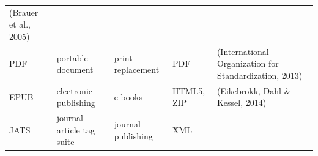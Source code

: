 \documentclass[10pt,fleqn]{wlpeerj}
\begin{document}
\begin{longtable}[c]{@{}lllll@{}}
\begin{minipage}[t]{0.40\columnwidth}
(Brauer et al., 2005)
\strut\end{minipage}\tabularnewline
\begin{minipage}[t]{0.06\columnwidth}\raggedright\strut
PDF
\strut\end{minipage} &
\begin{minipage}[t]{0.18\columnwidth}\raggedright\strut
portable document
\strut\end{minipage} &
\begin{minipage}[t]{0.13\columnwidth}\raggedright\strut
print replacement
\strut\end{minipage} &
\begin{minipage}[t]{0.09\columnwidth}\raggedright\strut
PDF
\strut\end{minipage} &
\begin{minipage}[t]{0.40\columnwidth}\raggedright\strut
(International Organization for Standardization, 2013)
\strut\end{minipage}\tabularnewline
\begin{minipage}[t]{0.06\columnwidth}\raggedright\strut
EPUB
\strut\end{minipage} &
\begin{minipage}[t]{0.18\columnwidth}\raggedright\strut
electronic publishing
\strut\end{minipage} &
\begin{minipage}[t]{0.13\columnwidth}\raggedright\strut
e-books
\strut\end{minipage} &
\begin{minipage}[t]{0.09\columnwidth}\raggedright\strut
HTML5, ZIP
\strut\end{minipage} &
\begin{minipage}[t]{0.40\columnwidth}\raggedright\strut
(Eikebrokk, Dahl \& Kessel, 2014)
\strut\end{minipage}\tabularnewline
\begin{minipage}[t]{0.06\columnwidth}\raggedright\strut
JATS
\strut\end{minipage} &
\begin{minipage}[t]{0.18\columnwidth}\raggedright\strut
journal article tag suite
\strut\end{minipage} &
\begin{minipage}[t]{0.13\columnwidth}\raggedright\strut
journal publishing
\strut\end{minipage} &
\begin{minipage}[t]{0.09\columnwidth}\raggedright\strut
XML
\strut\end{minipage} &
\begin{minipage}[t]{0.40\columnwidth}\raggedright\strut

\end{minipage}
\end{longtable}
\end{document}
